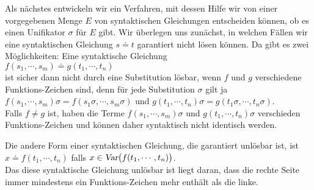 Als nächstes entwickeln wir ein Verfahren, mit dessen Hilfe wir von einer vorgegebenen
Menge $E$ von syntaktischen Gleichungen entscheiden können, ob es einen Unifikator $\sigma$ für $E$
gibt.  Wir überlegen uns zunächst, in welchen Fällen wir eine syntaktischen Gleichung $s \doteq t$
garantiert nicht lösen können.  Da gibt es zwei Möglichkeiten: Eine syntaktische Gleichung  \\[0.2cm]
\hspace*{1.3cm} $f(s_1,\cdots,s_m) \doteq g(t_1,\cdots, t_n)$ \\[0.2cm]
ist sicher dann nicht durch eine Substitution lösbar, wenn $f$ und $g$ verschiedene
Funktions-Zeichen sind, denn für jede Substitution $\sigma$ gilt ja \\[0.2cm]
\hspace*{1.0cm} $f(s_1,\cdots,s_m)\sigma = f(s_1\sigma,\cdots,s_m\sigma)$ \quad und \quad
                $g(t_1,\cdots, t_n)\sigma = g(t_1\sigma,\cdots,t_n\sigma)$. \\[0.2cm]
Falls $f \not = g$ ist, haben die Terme  $f(s_1,\cdots,s_m)\sigma$ und $g(t_1,\cdots, t_n)\sigma$ verschieden
Funktions-Zeichen und können daher syntaktisch nicht identisch werden.

Die andere Form einer syntaktischen Gleichung, die garantiert unlösbar ist, ist\\[0.2cm]
\hspace*{1.3cm} $x \doteq f(t_1,\cdots,t_n)$  \quad falls $x \in \textsl{Var}\big(f(t_1,\cdots,t_n)\big)$. \\[0.2cm]
Das diese syntaktische Gleichung unlösbar ist liegt daran, dass die rechte Seite immer mindestens ein
Funktions-Zeichen mehr enthält als die linke.  

